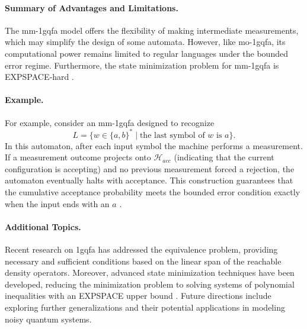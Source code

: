 \paragraph{Summary of Advantages and Limitations.}  
The \gls{mm-1gqfa} model offers the flexibility of making intermediate measurements, which may simplify the design of some automata. However, like \gls{mo-1gqfa}, its computational power remains limited to regular languages under the bounded error regime. Furthermore, the state minimization problem for \gls{mm-1gqfa} is EXPSPACE‐hard \cite{MATEUS201236}.

\paragraph{Example.}  
For example, consider an \gls{mm-1gqfa} designed to recognize 
\[
L=\{w\in\{a,b\}^* \mid \text{the last symbol of }w\text{ is }a\}.
\]
In this automaton, after each input symbol the machine performs a measurement. If a measurement outcome projects onto $\mathcal{H}_{acc}$ (indicating that the current configuration is accepting) and no previous measurement forced a rejection, the automaton eventually halts with acceptance. This construction guarantees that the cumulative acceptance probability meets the bounded error condition exactly when the input ends with an $a$ \cite{LI201273}.

\paragraph{Additional Topics.}  
Recent research on \gls{1gqfa} has addressed the equivalence problem, providing necessary and sufficient conditions based on the linear span of the reachable density operators. Moreover, advanced state minimization techniques have been developed, reducing the minimization problem to solving systems of polynomial inequalities with an EXPSPACE upper bound \cite{10.1007/978-3-540-88282-4_34}. Future directions include exploring further generalizations and their potential applications in modeling noisy quantum systems.


